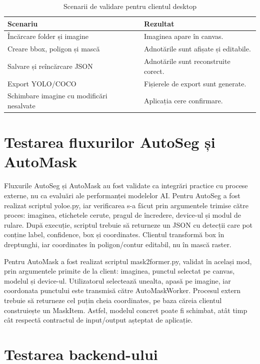 \begin{table}[!htbp]
    \centering
    \small
    \begin{tabular}{p{} p{}}
        \hline
        Scenariu & Rezultat \\
        \hline
        Încărcare folder și imagine & Imaginea apare în canvas. \\
        Creare bbox, poligon și mască & Adnotările sunt afișate și editabile. \\
        Salvare și reîncărcare JSON & Adnotările sunt reconstruite corect. \\
        Export YOLO/COCO & Fișierele de export sunt generate. \\
        Schimbare imagine cu modificări nesalvate & Aplicația cere confirmare. \\
        \hline
    \end{tabular}
    \caption{Scenarii de validare pentru clientul desktop}
    \label{tab:scenarii-client}
\end{table}

\section{Testarea fluxurilor AutoSeg și AutoMask}

Fluxurile AutoSeg și AutoMask au fost validate ca integrări practice cu procese externe, nu ca evaluări ale performanței modelelor AI. Pentru AutoSeg a fost realizat scriptul yoloe.py, iar verificarea s-a făcut prin argumentele trimise către proces: imaginea, etichetele cerute, pragul de încredere, device-ul și modul de rulare. După execuție, scriptul trebuie să returneze un JSON cu detecții care pot conține label, confidence, box și coordinates.
Clientul transformă box în dreptunghi, iar coordinates în poligon/contur editabil, nu în mască raster.

Pentru AutoMask a fost realizat scriptul mask2former.py, validat în același mod, prin argumentele primite de la client: imaginea, punctul selectat pe canvas, modelul și device-ul. Utilizatorul selectează unealta, apasă pe imagine, iar coordonata punctului este transmisă către AutoMaskWorker. Procesul extern trebuie să returneze cel puțin cheia coordinates, pe baza căreia clientul construiește un MaskItem. Astfel, modelul concret poate fi schimbat, atât timp cât respectă contractul de input/output așteptat de aplicație.

\section{Testarea backend-ului}

